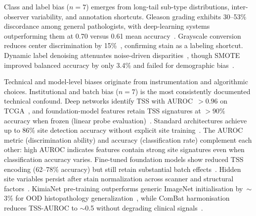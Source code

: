 Class and label bias ($n\!=\!7$) emerges from long-tail sub-type distributions, inter-observer variability, and annotation shortcuts. Gleason grading exhibits 30--53\% discordance among general pathologists, with deep-learning systems outperforming them at 0.70 versus 0.61 mean accuracy~\citep{nagpal2020development}. Grayscale conversion reduces center discrimination by 15\%~\citep{kheiri2025investigation, hagele2020resolving}, confirming stain as a labeling shortcut. Dynamic label denoising attenuates noise-driven disparities~\citep{liang2023dynamic}, though SMOTE improved balanced accuracy by only 3.4\% and failed for demographic bias~\citep{rezama2018imbalanced}.

Technical and model-level biases originate from instrumentation and algorithmic choices. Institutional and batch bias ($n\!=\!7$) is the most consistently documented technical confound. Deep networks identify TSS with AUROC~${>}0.96$ on TCGA~\citep{howard2021site}, and foundation-model features retain TSS signatures at ${>}90\%$ accuracy when frozen (linear probe evaluation)~\citep{komen2024batch, dehkharghanian2023biased}. Standard architectures achieve up to 86\% site detection accuracy without explicit site training~\citep{dehkharghanian2023biased}. The AUROC metric (discrimination ability) and accuracy (classification rate) complement each other: high AUROC indicates features contain strong site signatures even when classification accuracy varies. Fine-tuned foundation models show reduced TSS encoding (62--78\% accuracy) but still retain substantial batch effects~\citep{komen2024batch}. Hidden site variables persist after stain normalization across scanner and structural factors~\citep{schmitt2021hidden, bidgoli2022bias, mazaheri2023ranking}. KimiaNet pre-training outperforms generic ImageNet initialisation by~$\sim$3\% for OOD histopathology generalization~\citep{sikaroudi2023generalization}, while ComBat harmonisation reduces TSS-AUROC to $\sim$0.5 without degrading clinical signals~\citep{murchan2024combat}.


